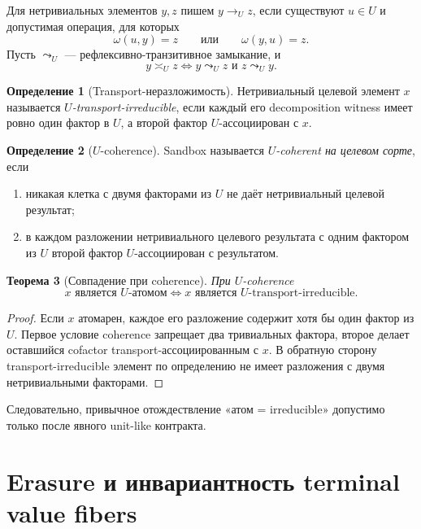 \documentclass[11pt]{article}
\newtheorem{theorem}{Теорема}[section]
\theoremstyle{definition}
\newtheorem{definition}[theorem]{Определение}
\theoremstyle{remark}
\begin{document}
Для нетривиальных элементов \(y,z\) пишем \(y\to_U z\), если существуют \(u\in U\) и допустимая операция, для которых
\[
\omega(u,y)=z
\qquad\text{или}\qquad
\omega(y,u)=z.
\]
Пусть \(\leadsto_U\) — рефлексивно-транзитивное замыкание, и
\[
y\asymp_U z
\iff y\leadsto_U z\text{ и }z\leadsto_U y.
\]

\begin{definition}[Transport-неразложимость]
Нетривиальный целевой элемент \(x\) называется \emph{\(U\)-transport-irreducible}, если каждый его decomposition witness имеет ровно один фактор в \(U\), а второй фактор \(U\)-ассоциирован с \(x\).
\end{definition}

\begin{definition}[\(U\)-coherence]
Sandbox называется \emph{\(U\)-coherent на целевом сорте}, если
\begin{enumerate}[label=(\roman*)]
\item никакая клетка с двумя факторами из \(U\) не даёт нетривиальный целевой результат;
\item в каждом разложении нетривиального целевого результата с одним фактором из \(U\) второй фактор \(U\)-ассоциирован с результатом.
\end{enumerate}
\end{definition}

\begin{theorem}[Совпадение при coherence]
При \(U\)-coherence
\begin{equation}
\boxed{x\text{ является }U\text{-атомом}\iff x\text{ является }U\text{-transport-irreducible}.}
\label{eq:irreducible}
\end{equation}
\end{theorem}

\begin{proof}
Если \(x\) атомарен, каждое его разложение содержит хотя бы один фактор из \(U\). Первое условие coherence запрещает два тривиальных фактора, второе делает оставшийся cofactor transport-ассоциированным с \(x\). В обратную сторону transport-irreducible элемент по определению не имеет разложения с двумя нетривиальными факторами.
\end{proof}

Следовательно, привычное отождествление «атом = irreducible» допустимо только после явного unit-like контракта.

\section{Erasure и инвариантность terminal value fibers}
\end{document}
